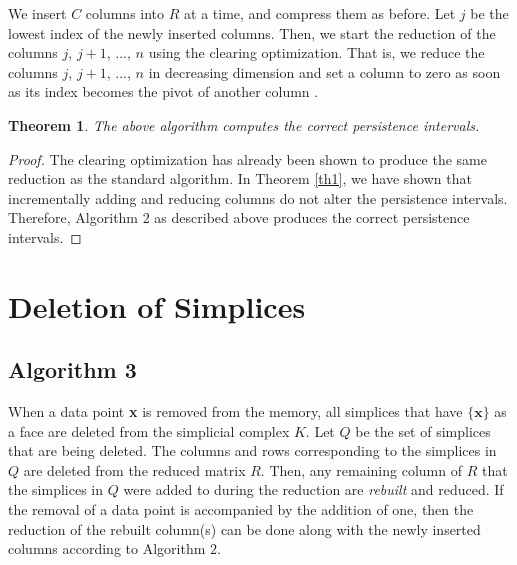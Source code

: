 \documentclass[11pt]{article}
\newtheorem{theorem}{Theorem}[section]
\begin{document}
We insert $C$ columns into $R$ at a time, and compress them as before.  Let $j$ be the lowest index 
of the newly inserted columns.  Then, we start the reduction of the columns $j$, $j + 1$, ..., $n$ 
using the clearing optimization.  That is, we reduce the columns $j$, $j + 1$, ..., $n$ in 
decreasing dimension and set a column to zero as soon as its index becomes the pivot of another 
column \cite{chen-11}.


\begin{theorem}
	The above algorithm computes the correct persistence intervals.
\end{theorem}


\begin{proof}
	
	The clearing optimization has already been shown to produce the same reduction as the standard
	algorithm.  In Theorem \ref{th1}, we have shown that incrementally adding and reducing columns  
	do not alter the persistence intervals.  Therefore, Algorithm $2$ as described above produces 
	the correct persistence intervals.
	
\end{proof}




\section{Deletion of Simplices}

\subsection{Algorithm 3}

When a data point \textbf{x} is removed from the memory, all simplices that have $\{\textbf{x}\}$ 
as a face are deleted from the simplicial complex $K$. Let $Q$ be the set of simplices that are 
being deleted.  The columns and rows corresponding to the simplices in $Q$ are deleted from the 
reduced matrix $R$.  Then, any remaining column of $R$ that the simplices in $Q$ were added to 
during the reduction are \emph{rebuilt} and reduced.  If the removal of a data point is accompanied 
by the addition of one, then the reduction of the rebuilt column(s) can be done along with the 
newly inserted columns according to Algorithm $2$.




\end{document}
